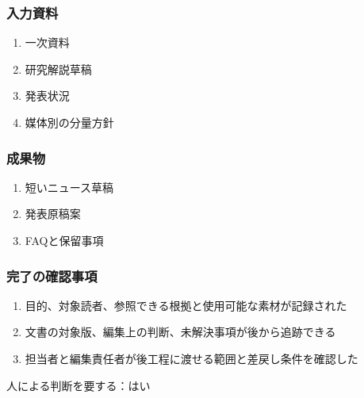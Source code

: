 \documentclass[a4paper,11pt]{article}
\begin{document}
\subsubsection*{入力資料}
\begin{enumerate}[leftmargin=2em,itemsep=0.35em]
\item 一次資料
\item 研究解説草稿
\item 発表状況
\item 媒体別の分量方針
\end{enumerate}
\subsubsection*{成果物}
\begin{enumerate}[leftmargin=2em,itemsep=0.35em]
\item 短いニュース草稿
\item 発表原稿案
\item FAQと保留事項
\end{enumerate}
\subsubsection*{完了の確認事項}
\begin{enumerate}[leftmargin=2em,itemsep=0.35em]
\item 目的、対象読者、参照できる根拠と使用可能な素材が記録された
\item 文書の対象版、編集上の判断、未解決事項が後から追跡できる
\item 担当者と編集責任者が後工程に渡せる範囲と差戻し条件を確認した
\end{enumerate}
\par 人による判断を要する：はい\par\medskip
\end{document}
